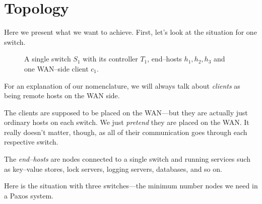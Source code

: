 \section{Topology}

Here we present what we want to achieve.  First, let's look at the situation
for one switch.

\begin{figure}[H]
  \centering
  \caption{A single switch $S_1$ with its controller $T_1$, end--hosts
    $h_1, h_2, h_3$ and one WAN--side client $c_1$.}
  \label{figure:graph.single.switch}
\end{figure}

For an explanation of our nomenclature, we will always talk about
\textit{clients} as being remote hosts on the \ac{WAN} side.

The clients are supposed to be placed on the \ac{WAN}---but they are actually
just ordinary hosts on each switch.  We just \textit{pretend} they are
placed on the WAN.  It really doesn't matter, though, as all of their
communication goes through each respective switch.

The \textit{end--hosts} are nodes connected to a single switch and running
services such as key--value stores, lock servers, logging servers,
databases, and so on.

Here is the situation with three switches---the minimum number nodes we need
in a Paxos system.

